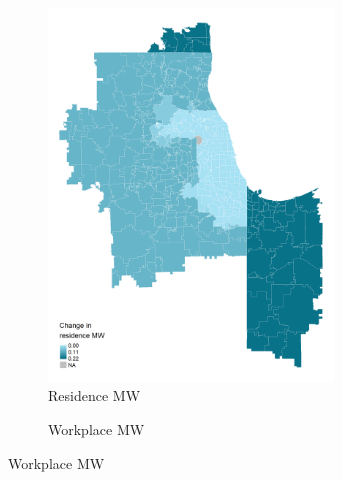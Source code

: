 \documentclass[aspectratio=169, t]{beamer}
\begin{document}
\begin{frame}[label = changes_mw_measures]
    \vspace{-3.5mm}
    
    \begin{figure}
        \begin{subfigure}{0.5\textwidth}
            \caption*{Residence MW}
            \includegraphics[width = 0.83\textwidth]{counterfactuals/output/chicago_d_mw_res.png}
        \end{subfigure}%
        \begin{subfigure}{0.5\textwidth}
            \caption*{Workplace MW}

\end{subfigure}
\end{figure}
\end{frame}
\end{document}
